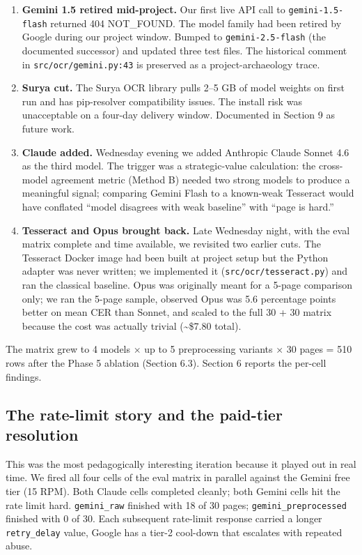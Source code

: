 \documentclass[
  letterpaper,
  DIV=11,
  numbers=noendperiod]{scrartcl}
\begin{document}
\begin{enumerate}
\def\labelenumi{\arabic{enumi}.}
\item
  \textbf{Gemini 1.5 retired mid-project.} Our first live API call to
  \texttt{gemini-1.5-flash} returned 404 NOT\_FOUND. The model family
  had been retired by Google during our project window. Bumped to
  \texttt{gemini-2.5-flash} (the documented successor) and updated three
  test files. The historical comment in \texttt{src/ocr/gemini.py:43} is
  preserved as a project-archaeology trace.
\item
  \textbf{Surya cut.} The Surya OCR library pulls 2--5 GB of model
  weights on first run and has pip-resolver compatibility issues. The
  install risk was unacceptable on a four-day delivery window.
  Documented in Section 9 as future work.
\item
  \textbf{Claude added.} Wednesday evening we added Anthropic Claude
  Sonnet 4.6 as the third model. The trigger was a strategic-value
  calculation: the cross-model agreement metric (Method B) needed two
  strong models to produce a meaningful signal; comparing Gemini Flash
  to a known-weak Tesseract would have conflated ``model disagrees with
  weak baseline'' with ``page is hard.''
\item
  \textbf{Tesseract and Opus brought back.} Late Wednesday night, with
  the eval matrix complete and time available, we revisited two earlier
  cuts. The Tesseract Docker image had been built at project setup but
  the Python adapter was never written; we implemented it
  (\texttt{src/ocr/tesseract.py}) and ran the classical baseline. Opus
  was originally meant for a 5-page comparison only; we ran the 5-page
  sample, observed Opus was 5.6 percentage points better on mean CER
  than Sonnet, and scaled to the full 30 + 30 matrix because the cost
  was actually trivial (\textasciitilde\$7.80 total).
\end{enumerate}

The matrix grew to 4 models × up to 5 preprocessing variants × 30 pages
= 510 rows after the Phase 5 ablation (Section 6.3). Section 6 reports
the per-cell findings.

\subsection{The rate-limit story and the paid-tier
resolution}\label{the-rate-limit-story-and-the-paid-tier-resolution}

This was the most pedagogically interesting iteration because it played
out in real time. We fired all four cells of the eval matrix in parallel
against the Gemini free tier (15 RPM). Both Claude cells completed
cleanly; both Gemini cells hit the rate limit hard. \texttt{gemini\_raw}
finished with 18 of 30 pages; \texttt{gemini\_preprocessed} finished
with 0 of 30. Each subsequent rate-limit response carried a longer
\texttt{retry\_delay} value, Google has a tier-2 cool-down that
escalates with repeated abuse.
\end{document}
